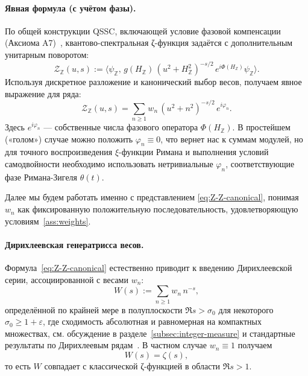 \documentclass{article}
\numberwithin{equation}{section}
\theoremstyle{plain}
\theoremstyle{definition}
\theoremstyle{remark}
\def\phi{φ}\def\Phi{Φ}\def\psi{ψ}\def\Psi{Ψ}%
\def\theta{θ}\def\Theta{Θ}\def\pi{π}\def\Pi{Π}%
\begin{document}
\paragraph{Явная формула (с учётом фазы).}
По общей конструкции QSSC, включающей условие фазовой компенсации (Аксиома A7)~\cite{Monakhov-QSG-002}, квантово-спектральная ζ-функция задаётся с дополнительным унитарным поворотом:
\begin{equation}
\label{eq:Z-Z-general}
\mathcal Z_{\mathbb Z}(u,s)
:=
\big\langle
\psi_{\mathbb Z},\,
g(H_{\mathbb Z})\,(u^2+H_{\mathbb Z}^2)^{-s/2}\,e^{i\Phi(H_{\mathbb Z})}\psi_{\mathbb Z}
\big\rangle.
\end{equation}
Используя дискретное разложение и канонический выбор весов, получаем явное выражение для ряда:
\begin{equation}
\label{eq:Z-Z-canonical}
\mathcal Z_{\mathbb Z}(u,s)
=
\sum_{n\ge 1}
w_n\,(u^2+n^2)^{-s/2}\,e^{i\phi_n}.
\end{equation}
Здесь $e^{i\phi_n}$ — собственные числа фазового оператора $\Phi(H_{\mathbb Z})$. 
В простейшем («голом») случае можно положить $\phi_n \equiv 0$, что вернет нас к суммам модулей, 
но для точного воспроизведения $\xi$-функции Римана и выполнения условий самодвойности 
необходимо использовать нетривиальные $\phi_n$, соответствующие фазе Римана-Зигеля $\theta(t)$.


Далее мы будем работать именно с представлением
\eqref{eq:Z-Z-canonical}, понимая $w_n$ как фиксированную
положительную последовательность, удовлетворяющую
условиям~\ref{ass:weights}.

\paragraph{Дирихлеевская генератрисса весов.}
Формула~\eqref{eq:Z-Z-canonical} естественно приводит к введению
Дирихлеевской серии, ассоциированной с весами $w_n$:
\begin{equation}
\label{eq:W-Dirichlet}
W(s)
:=
\sum_{n\ge 1} w_n\,n^{-s},
\end{equation}
определённой по крайней мере в полуплоскости
$\Re s>\sigma_0$ для некоторого $\sigma_0\ge 1+\varepsilon$,
где сходимость абсолютная и равномерная на компактных множествах,
см. обсуждение в разделе~\ref{subsec:integer-measure} и стандартные
результаты по Дирихлеевым рядам~\cite{Titchmarsh1986,IwaniecKowalski2004}.
В частном случае $w_n\equiv 1$ получаем
\begin{equation}
\label{eq:W=zeta}
W(s)=\zeta(s),
\end{equation}
то есть $W$ совпадает с классической ζ-функцией в области
$\Re s>1$.
\end{document}
